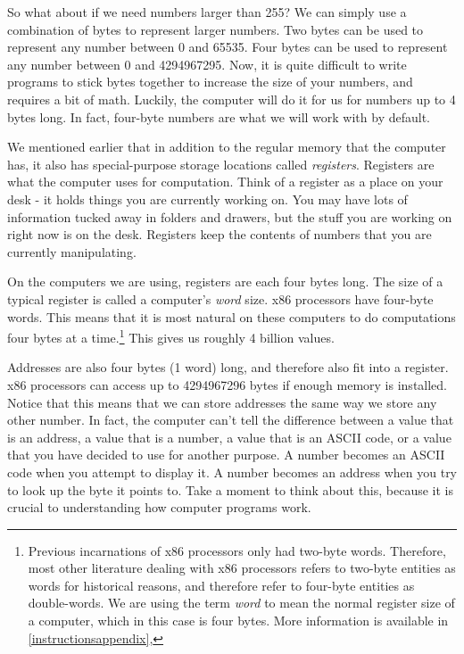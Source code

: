 So what about if we need numbers larger than 255?  We can simply use
a combination of bytes to represent larger numbers.  Two bytes can
be used to represent any number between 0 and 65535.  Four bytes
can be used to represent any number between 0 and 4294967295.  Now, it
is quite difficult to write programs to stick bytes together to increase
the size of your numbers, and requires a bit of math.  Luckily, the computer
will do it for us for numbers up to 4 bytes long.  In fact, four-byte numbers
are what we will work with by default.

We mentioned earlier that in addition to the regular memory that the 
computer has, it also has
special-purpose storage locations called \emph{registers}.
Registers are what the computer uses for computation.  
Think of a register as a place on your desk - it holds things you are currently
working on.  You may have lots of information tucked away in folders and
drawers, but the stuff you are working on right now is on the desk.  
Registers keep the contents of numbers that you are currently manipulating.

On the computers
we are using, registers are each four bytes long.  The size of a typical
register is called a computer's \emph{word} size.  x86 processors have four-byte words.  This means that it is most natural on
these computers to do computations four bytes at a time.\footnote{Previous incarnations of x86 processors only had two-byte words.  Therefore,
most other literature dealing with x86 processors refers to two-byte entities
as words for historical reasons, and therefore refer to four-byte entities as 
double-words.  We are using the term \emph{word} to mean the 
normal register size of a computer, which in this case is four bytes.  More
information is available in \autoref{instructionsappendix},
}
  This gives us
roughly 4 billion values.

Addresses are also four bytes (1 word) long, and therefore also fit into a 
register.  x86 processors can access
up to 4294967296 bytes if enough memory is installed.  Notice that this
means that we can store addresses the same way we store any other number.
In fact, the computer can't tell the difference between a value that is
an address, a value that is a number, a value that is an ASCII code, or
a value that you have decided to use for another purpose.  A number becomes
an ASCII code when you attempt to display it.  A number becomes an address
when you try to look up the byte it points to.  Take a moment to think about
this, because it is crucial to understanding how computer programs work.

